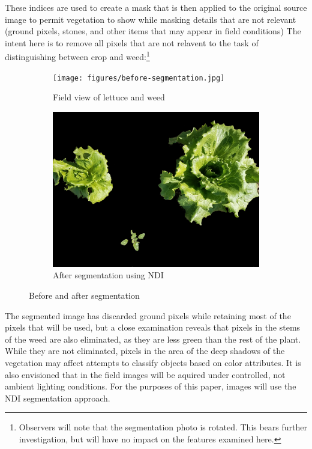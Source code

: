 \documentclass[letterpaper]{article}
\begin{document}
{\begin{table}[H]
\begin{tabular}{  l  p{4cm}  p{5cm} }
        \bottomrule
    \end{tabular}
\end{table}
These indices are used to create a mask that is then applied to the original source image to permit vegetation to show while masking details that are not relevant (ground pixels, stones, and other items that may appear in field conditions) The intent here is to remove all pixels that are not relavent to the task of distinguishing between crop and weed:\footnote{Observers will note that the segmentation photo is rotated. This bears further investigation, but will have no impact on the features examined here.}
\begin{figure}[H]
\centering
\begin{subfigure}[]{.32\textwidth}
  \centering
  \texttt{[image: figures/before-segmentation.jpg]}
  \caption{Field view of lettuce and weed}
  \label{fig:sub1}
\end{subfigure}
\begin{subfigure}{.32\textwidth}
  \centering
  \includegraphics[width=1\linewidth]{figures/after-segmentation.jpg}
  \caption{After segmentation using NDI}
  \label{fig:sub2}
\end{subfigure}
\caption{Before and after segmentation}
\label{fig:segmentation}
\end{figure}
The segmented image has discarded ground pixels while retaining most of the pixels that will be used, but a close examination reveals that pixels in the stems of the weed are also eliminated, as they are less green than the rest of the plant. While they are not eliminated, pixels in the area of the deep shadows of the vegetation may affect attempts to classify objects based on color attributes. It is also envisioned that in the field images will be aquired under controlled, not ambient lighting conditions. For the purposes of this paper, images will use the NDI segmentation approach.


}
\end{document}
